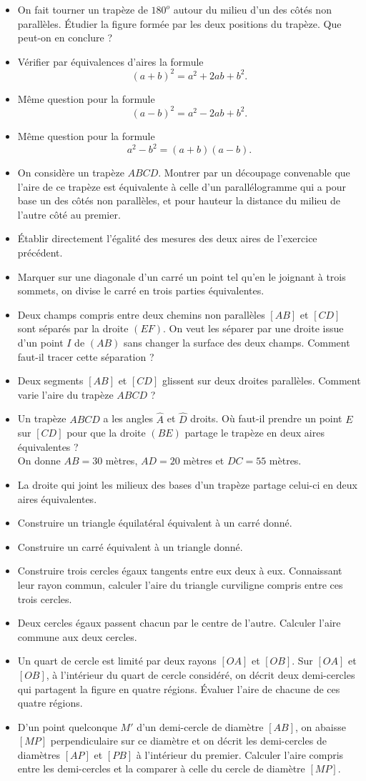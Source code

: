 \documentclass[12 pt]{report}
\theoremstyle{plain}
\newcounter{n}
\renewcommand{\it}{\item[$\mathbf{\then}.$]\stepcounter{n} }
\begin{document}
\begin{itemize}
\it On fait tourner un trapèze de $180^o$ autour du milieu d'un des côtés non parallèles. Étudier la figure formée par les deux positions du trapèze. Que peut-on en conclure ? 
\it Vérifier par équivalences d'aires la formule \[ (a+b)^2 = a^2 + 2ab + b^2.\]
\it Même question pour la formule \[(a-b)^2 = a^2-2ab+b^2.\]
\it Même question pour la formule \[a^2-b^2 = (a+b)(a-b).\]
\it On considère un trapèze $ABCD$. Montrer par un découpage convenable que l'aire de ce trapèze est équivalente à celle d'un parallélogramme qui a pour base un des côtés non parallèles, et pour hauteur la distance du milieu de l'autre côté au premier. 
\it Établir directement l'égalité des mesures des deux aires de l'exercice précédent. 
\it Marquer sur une diagonale d'un carré un point tel qu'en le joignant à trois sommets, on divise le carré en trois parties équivalentes. 
\it Deux champs compris entre deux chemins non parallèles $[AB]$ et $[CD]$ sont séparés par la droite $(EF)$. On veut les séparer par une droite issue d'un point $I$ de $(AB)$ sans changer la surface des deux champs. Comment faut-il tracer cette séparation ? 
\it Deux segments $[AB]$ et $[CD]$ glissent sur deux droites parallèles. Comment varie l'aire du trapèze $ABCD$ ? 
\it Un trapèze $ABCD$ a les angles $\widehat{A}$ et $\widehat{D}$ droits. Où faut-il prendre un point $E$ sur $[CD]$ pour que la droite
$(BE)$ partage le trapèze en deux aires équivalentes ? 
\\ On donne $AB = 30$ mètres, $AD= 20$ mètres et $DC = 55$ mètres. 
\it La droite qui joint les milieux des bases d'un trapèze partage
celui-ci en deux aires équivalentes. 
\it Construire un triangle équilatéral équivalent à un carré donné. 
\it Construire un carré équivalent à un triangle donné. 
\it Construire trois cercles égaux tangents entre eux deux à eux. Connaissant leur rayon commun, calculer l'aire du triangle curviligne compris entre ces trois cercles. 
\it Deux cercles égaux passent chacun par le centre de l'autre. Calculer l'aire commune aux deux cercles. 
\it Un quart de cercle est limité par deux rayons $[OA]$ et $[OB]$. Sur $[OA]$ et $[OB]$, à l'intérieur du quart de cercle considéré, on décrit deux demi-cercles qui partagent la figure en quatre régions. Évaluer l'aire de chacune de ces quatre régions. 
\it D'un point quelconque $M'$ d'un demi-cercle de diamètre $[AB]$, on 
abaisse $[MP]$ perpendiculaire sur ce diamètre et on décrit les demi-cercles de diamètres $[AP]$ et $[PB]$ à l'intérieur du premier. Calculer l'aire compris entre les demi-cercles et la comparer à celle du cercle de diamètre $[MP]$. 

\end{itemize}
\end{document}

